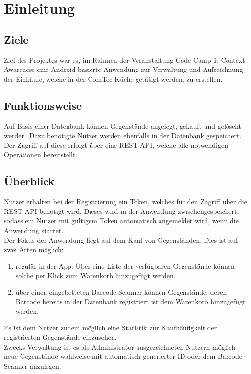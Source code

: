 \section{Einleitung}\label{sec:einleitung}

\subsection{Ziele}\label{subsec:ziele}

Ziel des Projektes war es, im Rahmen der Veranstaltung \glqq Code Camp 1: Context Awareness\grqq{} eine Android-basierte Anwendung zur Verwaltung und Aufzeichnung der Einkäufe, welche in der ComTec-Küche getätigt werden, zu erstellen.

\subsection{Funktionsweise}\label{subsec:funktionsweise}

Auf Basis einer Datenbank können Gegenstände angelegt, gekauft und gelöscht werden.
Dazu benötigte Nutzer werden ebenfalls in der Datenbank gespeichert.
Der Zugriff auf diese erfolgt über eine REST-API, welche alle notwendigen Operationen bereitstellt.

\subsection{Überblick}\label{subsec:überblick}

Nutzer erhalten bei der Registrierung ein Token, welches für den Zugriff über die REST-API benötigt wird.
Dieses wird in der Anwendung zwischengespeichert, sodass ein Nutzer mit gültigem Token automatisch angemeldet wird, wenn die Anwendung startet. \\
Der Fokus der Anwendung liegt auf dem Kauf von Gegenständen.
Dies ist auf zwei Arten möglich:

\begin{enumerate}
	\item regulär in der App: Über eine Liste der verfügbaren Gegenstände können solche per Klick zum Warenkorb hinzugefügt werden.

	\item über einen eingebetteten Barcode-Scanner können Gegenstände, deren Barcode bereits in der Datenbank registriert ist dem Warenkorb hinzugefügt werden.
\end{enumerate}

Es ist dem Nutzer zudem möglich eine Statistik zur Kaufhäufigkeit der registrierten Gegenstände einzusehen. \\
Zwecks Verwaltung ist es als Administrator ausgezeichneten Nutzern möglich neue Gegenstände wahlweise mit automatisch generierter ID oder dem Barcode-Scanner anzulegen.

